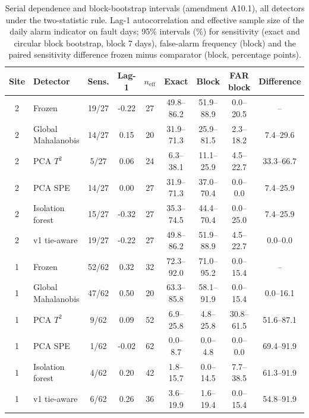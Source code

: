 \begin{table}[h!]\centering\scriptsize\caption{Serial dependence and block-bootstrap intervals (amendment A10.1), all detectors under the two-statistic rule. Lag-1 autocorrelation and effective sample size of the daily alarm indicator on fault days; 95\% intervals (\%) for sensitivity (exact and circular block bootstrap, block 7 days), false-alarm frequency (block) and the paired sensitivity difference frozen minus comparator (block, percentage points).}\label{tab:S14}
\begin{tabular}{clccccccc}\toprule
Site & Detector & Sens. & Lag-1 & $n_{\mathrm{eff}}$ & Exact & Block & FAR block & Difference\\\midrule
2 & Frozen & 19/27 & -0.22 & 27 & 49.8--86.2 & 51.9--88.9 & 0.0--20.5 & --\\
2 & Global Mahalanobis & 14/27 & 0.15 & 20 & 31.9--71.3 & 25.9--81.5 & 2.3--18.2 & 7.4--29.6\\
2 & PCA $T^2$ & 5/27 & 0.06 & 24 & 6.3--38.1 & 11.1--25.9 & 4.5--22.7 & 33.3--66.7\\
2 & PCA SPE & 14/27 & 0.00 & 27 & 31.9--71.3 & 37.0--70.4 & 0.0--0.0 & 7.4--25.9\\
2 & Isolation forest & 15/27 & -0.32 & 27 & 35.3--74.5 & 44.4--70.4 & 0.0--25.0 & 7.4--25.9\\
2 & v1 tie-aware & 19/27 & -0.22 & 27 & 49.8--86.2 & 51.9--88.9 & 4.5--22.7 & 0.0--0.0\\
1 & Frozen & 52/62 & 0.32 & 32 & 72.3--92.0 & 71.0--95.2 & 0.0--15.4 & --\\
1 & Global Mahalanobis & 47/62 & 0.50 & 20 & 63.3--85.8 & 58.1--91.9 & 0.0--15.4 & 0.0--16.1\\
1 & PCA $T^2$ & 9/62 & 0.09 & 52 & 6.9--25.8 & 4.8--25.8 & 30.8--61.5 & 51.6--87.1\\
1 & PCA SPE & 1/62 & -0.02 & 62 & 0.0--8.7 & 0.0--4.8 & 0.0--0.0 & 69.4--91.9\\
1 & Isolation forest & 4/62 & 0.20 & 42 & 1.8--15.7 & 0.0--14.5 & 7.7--38.5 & 61.3--91.9\\
1 & v1 tie-aware & 6/62 & 0.26 & 36 & 3.6--19.9 & 1.6--19.4 & 0.0--15.4 & 54.8--91.9\\
\bottomrule\end{tabular}\end{table}

